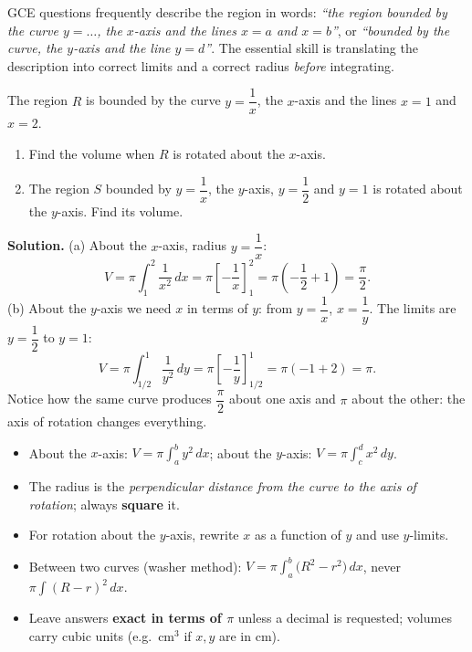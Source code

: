 \documentclass[11pt]{article}
\begin{document}
GCE questions frequently describe the region in words: \emph{``the region bounded by the curve $y=\ldots$, the $x$-axis and the lines $x=a$ and $x=b$''}, or \emph{``bounded by the curve, the $y$-axis and the line $y=d$''}. The essential skill is translating the description into correct limits and a correct radius \emph{before} integrating.

\begin{exoresolu}
The region $R$ is bounded by the curve $y=\dfrac{1}{x}$, the $x$-axis and the lines $x=1$ and $x=2$.
\begin{enumerate}
\item[(a)] Find the volume when $R$ is rotated about the $x$-axis.
\item[(b)] The region $S$ bounded by $y=\dfrac{1}{x}$, the $y$-axis, $y=\dfrac{1}{2}$ and $y=1$ is rotated about the $y$-axis. Find its volume.
\end{enumerate}
\tcblower
\textbf{Solution.} (a) About the $x$-axis, radius $y=\dfrac{1}{x}$:
\[ V=\pi\int_{1}^{2}\frac{1}{x^{2}}\,dx=\pi\left[-\frac{1}{x}\right]_{1}^{2}=\pi\left(-\frac{1}{2}+1\right)=\frac{\pi}{2}. \]
(b) About the $y$-axis we need $x$ in terms of $y$: from $y=\dfrac{1}{x}$, $x=\dfrac{1}{y}$. The limits are $y=\dfrac{1}{2}$ to $y=1$:
\[ V=\pi\int_{1/2}^{1}\frac{1}{y^{2}}\,dy=\pi\left[-\frac{1}{y}\right]_{1/2}^{1}=\pi\left(-1+2\right)=\pi. \]
Notice how the same curve produces $\dfrac{\pi}{2}$ about one axis and $\pi$ about the other: the axis of rotation changes everything.
\end{exoresolu}

\begin{aretenir}
\begin{itemize}
\item About the $x$-axis: $\displaystyle V=\pi\int_{a}^{b}y^{2}\,dx$; about the $y$-axis: $\displaystyle V=\pi\int_{c}^{d}x^{2}\,dy$.
\item The radius is the \emph{perpendicular distance from the curve to the axis of rotation}; always \textbf{square} it.
\item For rotation about the $y$-axis, rewrite $x$ as a function of $y$ and use $y$-limits.
\item Between two curves (washer method): $V=\pi\displaystyle\int_{a}^{b}\bigl(R^{2}-r^{2}\bigr)\,dx$, never $\pi\int(R-r)^{2}\,dx$.
\item Leave answers \textbf{exact in terms of $\pi$} unless a decimal is requested; volumes carry cubic units (e.g.\ $\mathrm{cm}^{3}$ if $x,y$ are in cm).
\end{itemize}
\end{aretenir}
\end{document}
